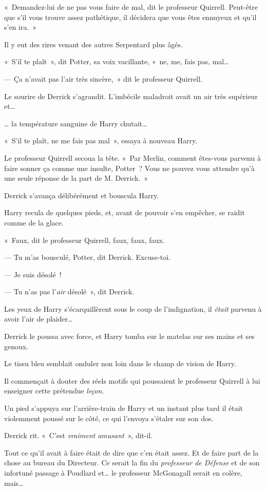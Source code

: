 «~Demandez-lui de ne pas vous faire de mal, dit le professeur Quirrell. Peut-être que s'il vous trouve assez pathétique, il décidera que vous êtes ennuyeux et qu'il s'en ira.~»

Il y eut des rires venant des autres Serpentard plus âgés.

«~S'il te plaît~», dit Potter, sa voix vacillante, «~ne, me, fais pas, mal…

--- Ça n'avait pas l'air très sincère,~» dit le professeur Quirrell.

Le sourire de Derrick s'agrandit. L'imbécile maladroit avait un air très supérieur et…

… la température sanguine de Harry chutait…

«~S'il te plaît, ne me fais pas mal~», essaya à nouveau Harry.

Le professeur Quirrell secoua la tête. «~Par Merlin, comment êtes-vous parvenu à faire sonner ça comme une insulte, Potter~? Vous ne pouvez vous attendre qu'à une seule réponse de la part de M. Derrick.~»

Derrick s'avança délibérément et bouscula Harry.

Harry recula de quelques pieds, et, avant de pouvoir s'en empêcher, se raidit comme de la glace.

«~Faux, dit le professeur Quirrell, faux, faux, faux.

--- Tu m'as bousculé, Potter, dit Derrick. Excuse-toi.

--- Je suis désolé~!

--- Tu n'as pas l'\emph{air} désolé~», dit Derrick.

Les yeux de Harry s'écarquillèrent sous le coup de l'indignation, il \emph{était} parvenu à avoir l'air de plaider…

Derrick le poussa avec force, et Harry tomba sur le matelas sur ses mains et ses genoux.

Le tissu bleu semblait onduler non loin dans le champ de vision de Harry.

Il commençait à douter des réels motifs qui poussaient le professeur Quirrell à lui enseigner cette prétendue \emph{leçon}.

Un pied s'appuya sur l'arrière-train de Harry et un instant plus tard il était violemment poussé sur le côté, ce qui l'envoya s'étaler sur son dos.

Derrick rit. «~C'est \emph{vraiment amusant}~», dit-il.

Tout ce qu'il avait à faire était de dire que c'en était assez. Et de faire part de la chose au bureau du Directeur. Ce serait la fin du \emph{professeur de Défense} et de son infortuné passage à Poudlard et… le professeur McGonagall serait en colère, mais…

